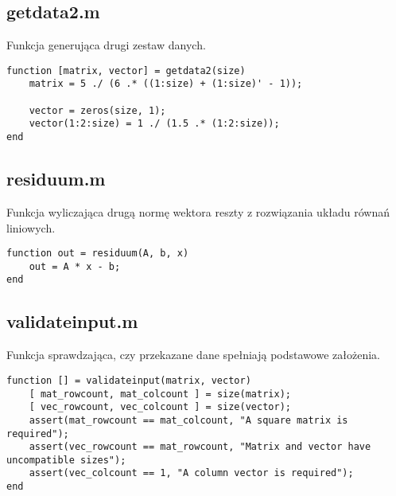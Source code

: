 \documentclass[12pt]{article}
\begin{document}
\subsection{getdata2.m}
Funkcja generująca drugi zestaw danych.
\begin{verbatim}
function [matrix, vector] = getdata2(size)
    matrix = 5 ./ (6 .* ((1:size) + (1:size)' - 1));

    vector = zeros(size, 1);
    vector(1:2:size) = 1 ./ (1.5 .* (1:2:size));
end
\end{verbatim}

\subsection{residuum.m}
Funkcja wyliczająca drugą normę wektora reszty z rozwiązania układu równań liniowych.
\begin{verbatim}
function out = residuum(A, b, x)
    out = A * x - b;
end
\end{verbatim}

\subsection{validateinput.m}
Funkcja sprawdzająca, czy przekazane dane spełniają podstawowe założenia.
\begin{verbatim}
function [] = validateinput(matrix, vector)
    [ mat_rowcount, mat_colcount ] = size(matrix);
    [ vec_rowcount, vec_colcount ] = size(vector);
    assert(mat_rowcount == mat_colcount, "A square matrix is required");
    assert(vec_rowcount == mat_rowcount, "Matrix and vector have uncompatible sizes");
    assert(vec_colcount == 1, "A column vector is required");
end
\end{verbatim}
\end{document}
